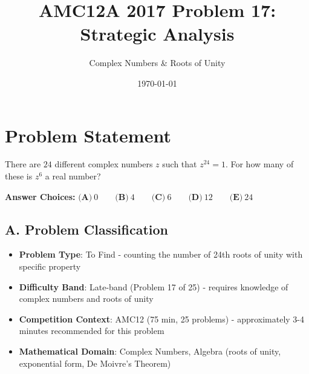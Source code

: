 \documentclass[]{article}
\begin{document}
\title{AMC12A 2017 Problem 17: Strategic Analysis}
\author{Complex Numbers \& Roots of Unity}
\date{\today}
\maketitle

\section*{Problem Statement}
There are $24$ different complex numbers $z$ such that $z^{24}=1$. For how many of these is $z^6$ a real number?

\textbf{Answer Choices:} $\textbf{(A)}\ 0 \qquad\textbf{(B)}\ 4 \qquad\textbf{(C)}\ 6 \qquad\textbf{(D)}\ 12 \qquad\textbf{(E)}\ 24$

\begin{problemconfigbox}
\subsection*{A. Problem Classification}
\begin{itemize}[leftmargin=*]
    \item \textbf{Problem Type}: To Find - counting the number of 24th roots of unity with specific property
    \item \textbf{Difficulty Band}: Late-band (Problem 17 of 25) - requires knowledge of complex numbers and roots of unity
    \item \textbf{Competition Context}: AMC12 (75 min, 25 problems) - approximately 3-4 minutes recommended for this problem
    \item \textbf{Mathematical Domain}: Complex Numbers, Algebra (roots of unity, exponential form, De Moivre's Theorem)
\end{itemize}


\end{problemconfigbox}
\end{document}
